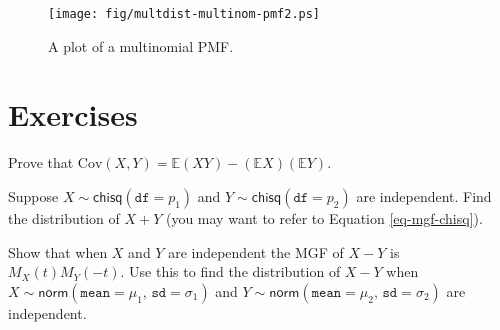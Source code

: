 \begin{figure}[ht!]
\centering
\texttt{[image: fig/multdist-multinom-pmf2.ps]}
\caption[Plot of a multinomial PMF]{\label{fig-multinom-pmf2}\small A plot of a multinomial PMF.}
\end{figure}

\newpage{}

\section{Exercises}
\label{sec-7-10}

\setcounter{thm}{0}

\begin{xca}
\label{xca-Prove-cov-shortcut} Prove that \(
\mbox{Cov}(X,Y)=\mathbb{E}(XY)-(\mathbb{E} X)(\mathbb{E} Y). \)
\end{xca}

\begin{xca}
\label{xca-sum-indep-chisq} Suppose
\(X\sim\mathsf{chisq}(\mathtt{df}=p_{1})\) and
\(Y\sim\mathsf{chisq}(\mathtt{df}=p_{2})\) are independent. Find the
distribution of \(X+Y\) (you may want to refer to Equation
\eqref{eq-mgf-chisq}).
\end{xca}

\begin{xca}
\label{xca-diff-indep-norm} Show that when \(X\) and \(Y\) are independent
the MGF of \(X-Y\) is \(M_{X}(t)M_{Y}(-t)\). Use this to find the
distribution of \(X-Y\) when
\(X\sim\mathsf{norm}(\mathtt{mean}=\mu_{1},\,\mathtt{sd}=\sigma_{1})\)
and
\(Y\sim\mathsf{norm}(\mathtt{mean}=\mu_{2},\,\mathtt{sd}=\sigma_{2})\)
are independent.
\end{xca}
